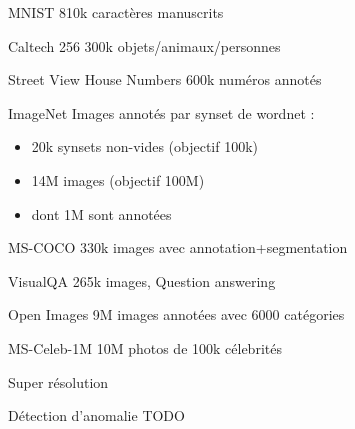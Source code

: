 \begin{frame}{MNIST}
  810k caractères manuscrits
\end{frame}

\begin{frame}{Caltech 256}
  300k objets/animaux/personnes
\end{frame}

\begin{frame}{Street View House Numbers}
  600k numéros annotés
\end{frame}

\begin{frame}{ImageNet}
  Images annotés par synset de wordnet :
  \begin{itemize}
    \item 20k synsets non-vides (objectif 100k)
    \item 14M images (objectif 100M)
    \item dont 1M sont annotées
  \end{itemize}
\end{frame}

\begin{frame}{MS-COCO}
   330k images avec annotation+segmentation
\end{frame}

\begin{frame}{VisualQA}
  265k images, Question answering
\end{frame}

\begin{frame}{Open Images}
  9M images annotées avec 6000 catégories
\end{frame}

\begin{frame}{MS-Celeb-1M}
  10M photos de 100k célebrités
\end{frame}

\begin{frame}{Super résolution}
\end{frame}

\begin{frame}{Détection d'anomalie}
  \alert{TODO}
\end{frame}
